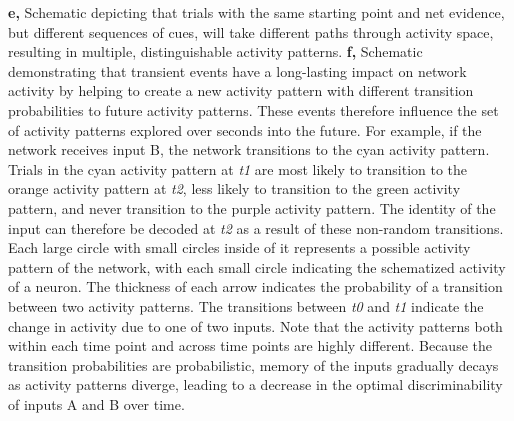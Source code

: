 \begin{FPfigure}
{%
\textbf{e,} Schematic depicting that trials with the same starting point and net evidence, but different sequences of cues, will take different paths through activity space, resulting in multiple, distinguishable activity patterns.
%
\textbf{f,} Schematic demonstrating that transient events have a long-lasting impact on network activity by helping to create a new activity pattern with different transition probabilities to future activity patterns. These events therefore influence the set of activity patterns explored over seconds into the future. For example, if the network receives input B, the network transitions to the cyan activity pattern. Trials in the cyan activity pattern at \textit{t1} are most likely to transition to the orange activity pattern at \textit{t2}, less likely to transition to the green activity pattern, and never transition to the purple activity pattern. The identity of the input can therefore be decoded at \textit{t2} as a result of these non-random transitions. Each large circle with small circles inside of it represents a possible activity pattern of the network, with each small circle indicating the schematized activity of a neuron. The thickness of each arrow indicates the probability of a transition between two activity patterns. The transitions between \textit{t0} and \textit{t1} indicate the change in activity due to one of two inputs. Note that the activity patterns both within each time point and across time points are highly different. Because the transition probabilities are probabilistic, memory of the inputs gradually decays as activity patterns diverge, leading to a decrease in the optimal discriminability of inputs A and B over time.  
\label{fig:3_15}}
\end{FPfigure}
\clearpage

